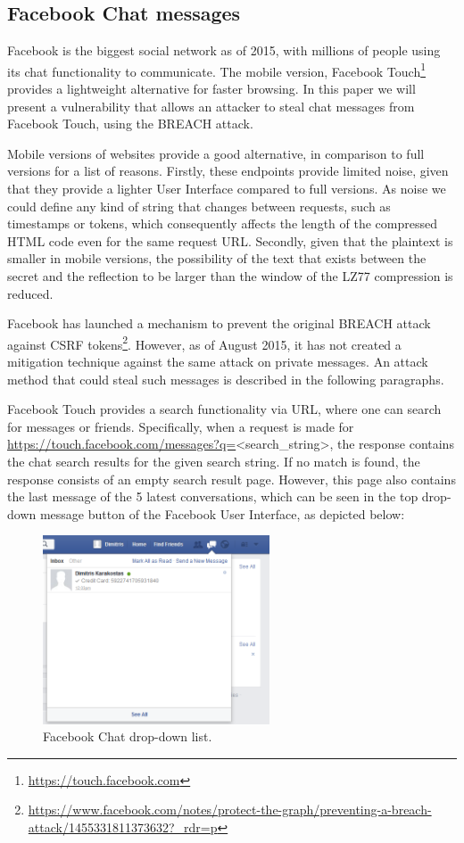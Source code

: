 \subsection{Facebook Chat messages}\label{subsec:fb}

Facebook is the biggest social network as of 2015, with millions of people using
its chat functionality to communicate. The mobile version, Facebook
Touch\footnote{\url{https://touch.facebook.com}} provides a lightweight
alternative for faster browsing. In this paper we will present a vulnerability
that allows an attacker to steal chat messages from Facebook Touch, using the
BREACH attack.

Mobile versions of websites provide a good alternative, in comparison to full
versions for a list of reasons. Firstly, these endpoints provide limited noise,
given that they provide a lighter User Interface compared to full versions. As
noise we could define any kind of string that changes between requests, such as
timestamps or tokens, which consequently affects the length of the compressed
HTML code even for the same request URL. Secondly, given that the plaintext is
smaller in mobile versions, the possibility of the text that exists between the
secret and the reflection to be larger than the window of the LZ77 compression
is reduced.

Facebook has launched a mechanism to prevent the original BREACH attack against
CSRF
tokens\footnote{\url{https://www.facebook.com/notes/protect-the-graph/preventing-a-breach-attack/1455331811373632?_rdr=p}}.
However, as of August 2015, it has not created a mitigation technique against
the same attack on private messages. An attack method that could steal such
messages is described in the following paragraphs.

Facebook Touch provides a search functionality via URL, where one can search for
messages or friends. Specifically, when a request is made for
\url{https://touch.facebook.com/messages?q=}<search\_string>, the response
contains the chat search results for the given search string. If no match is
found, the response consists of an empty search result page. However, this page
also contains the last message of the 5 latest conversations, which can be seen
in the top drop-down message button of the Facebook User Interface, as depicted
below:

\begin{figure}[H] \caption{Facebook Chat drop-down list.} \centering
\includegraphics[width=0.6\textwidth]{diagrams/fb_message.png}\end{figure}

